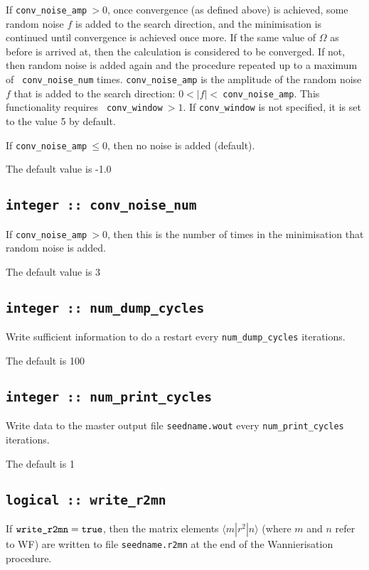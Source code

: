 If {\tt conv\_noise\_amp}$\:>0$, once convergence (as defined above) is
achieved, some random noise $f$ is added to the search direction, and the
minimisation is continued until convergence is achieved once more. If 
the same value of $\Omega$ as before is arrived at, then the calculation
is considered to be converged. If not, then random noise is added
again and the procedure repeated up to a maximum of {\tt
  conv\_noise\_num} times. {\tt conv\_noise\_amp} is the amplitude of
the random noise $f$ that is added to the search direction: 
$0 < |f| <\:${\tt conv\_noise\_amp}. This functionality requires {\tt
  conv\_window}$\:>1$. If {\tt conv\_window} is not specified, it is set
to the value 5 by default. 

If {\tt conv\_noise\_amp}$\:\leq 0$, then no noise is added (default).

The default value is -1.0

\subsection[conv\_noise\_num]{\tt integer :: conv\_noise\_num}

If {\tt conv\_noise\_amp}$\:>0$, then this is the number of times in the
minimisation that random noise is added.

The default value is 3

\subsection[num\_dump\_cycles]{\tt integer :: num\_dump\_cycles}
Write sufficient information to do a restart every
\verb#num_dump_cycles# iterations.

The default is 100

\subsection[num\_print\_cycles]{\tt integer :: num\_print\_cycles}
Write data to the master output file {\tt seedname.wout} every
\verb#num_print_cycles# iterations.

The default is 1

\subsection[write\_r2mn]{\tt logical :: write\_r2mn}

If $\verb#write_r2mn#=\verb#true#$, then the matrix elements
$\langle m|r^2|n\rangle$ (where $m$ and $n$ refer to WF) are written 
to file \verb#seedname.r2mn# at the end of the Wannierisation
procedure. 

